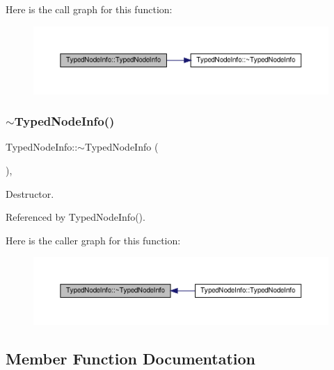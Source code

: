 Here is the call graph for this function\+:
\nopagebreak
\begin{figure}[H]
\begin{center}
\leavevmode
\includegraphics[width=350pt]{db/d12/structTypedNodeInfo_a274ac58a99402be306cd888541f935c8_cgraph}
\end{center}
\end{figure}
\mbox{\label{structTypedNodeInfo_ac49f2aecdc6d3c537ecd887ed75b7de0}} 
\subsubsection{\texorpdfstring{$\sim$\+Typed\+Node\+Info()}{~TypedNodeInfo()}}
{\footnotesize\ttfamily Typed\+Node\+Info\+::$\sim$\+Typed\+Node\+Info (\begin{DoxyParamCaption}{ }\end{DoxyParamCaption})\hspace{0.3cm}{\ttfamily [override]}, {\ttfamily [default]}}



Destructor. 



Referenced by Typed\+Node\+Info().

Here is the caller graph for this function\+:
\nopagebreak
\begin{figure}[H]
\begin{center}
\leavevmode
\includegraphics[width=350pt]{db/d12/structTypedNodeInfo_ac49f2aecdc6d3c537ecd887ed75b7de0_icgraph}
\end{center}
\end{figure}


\subsection{Member Function Documentation}
\mbox{\label{structTypedNodeInfo_ad2e8b00442b9215ece3d7b2cf2495aef}} 
